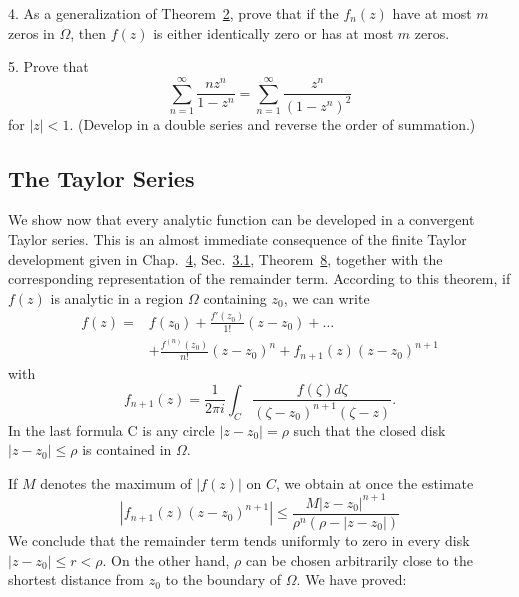 4. As a generalization of Theorem~\hyperref[thm:5.2]{2}, prove that if the $f_{n}(z)$ have at most $m$ zeros in $\Omega$, then $f(z)$ is either identically zero or has at most $m$ zeros.

5. Prove that
\begin{equation*}
\sum_ {n = 1} ^ {\infty} \frac {n z ^ {n}}{1 - z ^ {n}} = \sum_ {n = 1} ^ {\infty} \frac {z ^ {n}}{(1 - z ^ {n}) ^ {2}}
\end{equation*}
for $|z| < 1$. (Develop in a double series and reverse the order of summation.)

\setcounter{section}{1}\setcounter{subsection}{1}\subsection{The Taylor Series}\label{sec:5.1.2}
We show now that every analytic function can be developed in a convergent Taylor series. This is an almost immediate consequence of the finite Taylor development given in Chap.~\hyperref[chap:4]{4}, Sec.~\hyperref[sec:4.3.1]{3.1}, Theorem~\hyperref[thm:4.8]{8}, together with the corresponding representation of the remainder term. According to this theorem, if $f(z)$ is analytic in a region $\Omega$ containing $z_{0}$, we can write
\begin{equation*}
\begin{aligned}
f(z)={}&f(z_0)+\frac{f'(z_0)}{1!}(z-z_0)+\dots\\
&+\frac{f^{(n)}(z_0)}{n!}(z-z_0)^n+f_{n+1}(z)(z-z_0)^{n+1}
\end{aligned}
\end{equation*}
with
\begin{equation*}
f _ {n + 1} (z) = \frac {1}{2 \pi i} \int_ {C} \frac {f (\zeta) d \zeta}{(\zeta - z _ {0}) ^ {n + 1} (\zeta - z)}.
\end{equation*}
In the last formula C is any circle $|z - z_{0}| = \rho$ such that the closed disk $|z - z_{0}| \leq \rho$ is contained in $\Omega$.

If $M$ denotes the maximum of $|f(z)|$ on $C$, we obtain at once the estimate
\begin{equation*}
\left| f _ {n + 1} (z) \left(z - z _ {0}\right) ^ {n + 1} \right| \leq \frac {M \left| z - z _ {0} \right| ^ {n + 1}}{\rho^ {n} (\rho - | z - z _ {0} |)}
\end{equation*}
We conclude that the remainder term tends uniformly to zero in every disk $|z - z_{0}| \leq r < \rho$. On the other hand, $\rho$ can be chosen arbitrarily close to the shortest distance from $z_{0}$ to the boundary of $\Omega$. We have proved:

